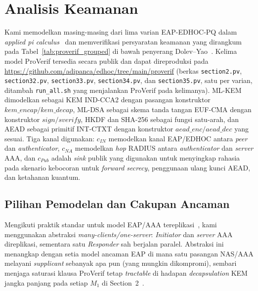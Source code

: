 \documentclass{easychair}
\newcommand{\VarSec}[1]{Section~#1~\cite{pq-edhoc-draft}}
\begin{document}
\section{Analisis Keamanan}
\label{security-analysis}
Kami memodelkan masing-masing dari lima varian EAP-EDHOC-PQ dalam
\emph{applied pi calculus}~\cite{blanchet2001proverif,blanchet2016automated}
dan memverifikasi persyaratan keamanan yang dirangkum pada
Tabel~\ref{tab:proverif_grouped} di bawah penyerang
Dolev--Yao~\cite{dolev1983security,cremers2017symbolic}. Kelima
model ProVerif tersedia secara publik dan dapat direproduksi pada
\url{https://github.com/adipanca/edhoc/tree/main/proverif}
(berkas \texttt{section2.pv}, \texttt{section32.pv},
\texttt{section33.pv}, \texttt{section34.pv}, dan
\texttt{section35.pv}, satu per varian, ditambah \texttt{run\_all.sh}
yang menjalankan ProVerif pada kelimanya). ML-KEM
dimodelkan sebagai KEM IND-CCA2 dengan pasangan konstruktor
$\mathit{kem\_encap}/\mathit{kem\_decap}$, ML-DSA sebagai skema tanda
tangan EUF-CMA dengan konstruktor $\mathit{sign}/\mathit{sverify}$,
HKDF dan SHA-256 sebagai fungsi satu-arah, dan AEAD sebagai primitif
INT-CTXT dengan konstruktor $\mathit{aead\_enc}/\mathit{aead\_dec}$
yang sesuai. Tiga kanal digunakan: $c_{IN}$ memodelkan kanal
EAP/EDHOC antara \emph{peer} dan \emph{authenticator}, $c_{NA}$
memodelkan \emph{hop} RADIUS antara \emph{authenticator} dan
\emph{server} AAA, dan $c_{Pub}$ adalah \emph{sink} publik yang
digunakan untuk menyingkap rahasia pada skenario kebocoran untuk
\emph{forward secrecy}, penggunaan ulang kunci AEAD, dan ketahanan
kuantum.

\subsection{Pilihan Pemodelan dan Cakupan Ancaman}
Mengikuti praktik standar untuk model EAP/AAA
tereplikasi~\cite{NSB21,JKK+23}, kami menggunakan abstraksi
\emph{many-clients/one-server}: \emph{Initiator} dan \emph{server}
AAA direplikasi, sementara satu \emph{Responder} sah berjalan paralel.
Abstraksi ini menangkap dengan setia model ancaman EAP di mana satu
pasangan NAS/AAA melayani \emph{supplicant} sebanyak apa pun
(yang mungkin dikompromi), sembari menjaga saturasi klausa ProVerif
tetap \emph{tractable} di hadapan \emph{decapsulation} KEM jangka
panjang pada setiap $M_1$ di \VarSec{2}.
\end{document}
